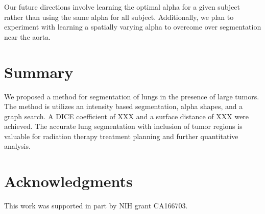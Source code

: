 \documentclass{llncs}
\begin{document}
Our future directions involve learning the optimal alpha for a given subject rather than using the same alpha for all subject. Additionally, we plan to experiment with learning a spatially varying alpha to overcome over segmentation near the aorta.
%
\section{Summary}
%
We proposed a method for segmentation of lungs in the presence of large tumors. The method is utilizes an intensity based segmentation, alpha shapes, and a graph search. A DICE coefficient of XXX and a surface distance of XXX were achieved. The accurate lung segmentation with  inclusion of tumor regions is valuable for radiation therapy treatment planning and further quantitative analysis.
%
\section{Acknowledgments}
%
This work was supported in part by NIH grant CA166703.



%
%









\clearpage
{} %
\renewcommand{\indexname}{Author Index}
\printindex
\clearpage

\end{document}

